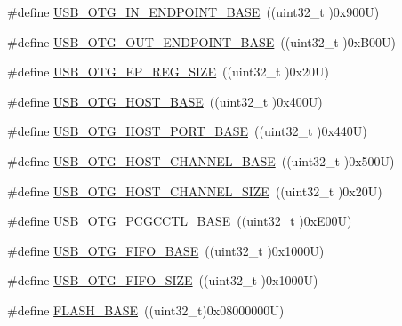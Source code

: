 \begin{DoxyCompactItemize}
\item 
\#define \hyperlink{group___peripheral__registers__structures_gad8f69041452615aeb3948600e3882246}{U\+S\+B\+\_\+\+O\+T\+G\+\_\+\+I\+N\+\_\+\+E\+N\+D\+P\+O\+I\+N\+T\+\_\+\+B\+A\+SE}~((uint32\+\_\+t )0x900\+U)
\item 
\#define \hyperlink{group___peripheral__registers__structures_gaf0e972b8f028ecf44a652029efbd4642}{U\+S\+B\+\_\+\+O\+T\+G\+\_\+\+O\+U\+T\+\_\+\+E\+N\+D\+P\+O\+I\+N\+T\+\_\+\+B\+A\+SE}~((uint32\+\_\+t )0x\+B00\+U)
\item 
\#define \hyperlink{group___peripheral__registers__structures_ga6fdb7429ad88e2d69440d6ecc4f4199e}{U\+S\+B\+\_\+\+O\+T\+G\+\_\+\+E\+P\+\_\+\+R\+E\+G\+\_\+\+S\+I\+ZE}~((uint32\+\_\+t )0x20\+U)
\item 
\#define \hyperlink{group___peripheral__registers__structures_ga3bb2dd6c82eefd8587b6146ba36ae071}{U\+S\+B\+\_\+\+O\+T\+G\+\_\+\+H\+O\+S\+T\+\_\+\+B\+A\+SE}~((uint32\+\_\+t )0x400\+U)
\item 
\#define \hyperlink{group___peripheral__registers__structures_ga42f433cb79ca69f09972e690fda6737a}{U\+S\+B\+\_\+\+O\+T\+G\+\_\+\+H\+O\+S\+T\+\_\+\+P\+O\+R\+T\+\_\+\+B\+A\+SE}~((uint32\+\_\+t )0x440\+U)
\item 
\#define \hyperlink{group___peripheral__registers__structures_ga942c8c5241b80fbcf638fea0fa18bebd}{U\+S\+B\+\_\+\+O\+T\+G\+\_\+\+H\+O\+S\+T\+\_\+\+C\+H\+A\+N\+N\+E\+L\+\_\+\+B\+A\+SE}~((uint32\+\_\+t )0x500\+U)
\item 
\#define \hyperlink{group___peripheral__registers__structures_ga266cb1dbb50faf447f9c15d2ee93a522}{U\+S\+B\+\_\+\+O\+T\+G\+\_\+\+H\+O\+S\+T\+\_\+\+C\+H\+A\+N\+N\+E\+L\+\_\+\+S\+I\+ZE}~((uint32\+\_\+t )0x20\+U)
\item 
\#define \hyperlink{group___peripheral__registers__structures_gaa9766975aca084c257730879568bc7cf}{U\+S\+B\+\_\+\+O\+T\+G\+\_\+\+P\+C\+G\+C\+C\+T\+L\+\_\+\+B\+A\+SE}~((uint32\+\_\+t )0x\+E00\+U)
\item 
\#define \hyperlink{group___peripheral__registers__structures_gace340350802904868673f0e839c4fa04}{U\+S\+B\+\_\+\+O\+T\+G\+\_\+\+F\+I\+F\+O\+\_\+\+B\+A\+SE}~((uint32\+\_\+t )0x1000\+U)
\item 
\#define \hyperlink{group___peripheral__registers__structures_ga8781c4b2406c740d9fe540737a6a0188}{U\+S\+B\+\_\+\+O\+T\+G\+\_\+\+F\+I\+F\+O\+\_\+\+S\+I\+ZE}~((uint32\+\_\+t )0x1000\+U)
\item 
\#define \hyperlink{group___peripheral__registers__structures_ga23a9099a5f8fc9c6e253c0eecb2be8db}{F\+L\+A\+S\+H\+\_\+\+B\+A\+SE}~((uint32\+\_\+t)0x08000000\+U)

\end{DoxyCompactItemize}

